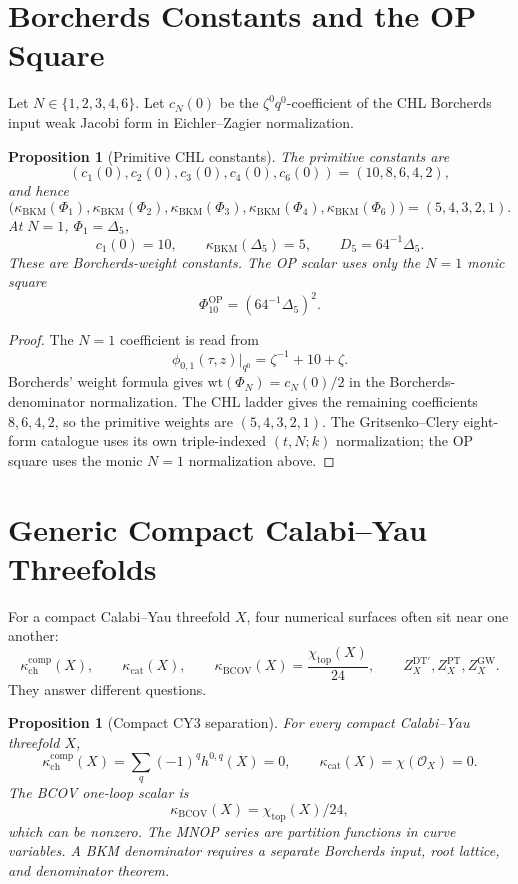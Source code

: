 \documentclass[11pt]{article}
\newtheorem{proposition}[theorem]{Proposition}
\providecommand{\cO}{\mathcal{O}}
\providecommand{\DT}{\mathrm{DT}}
\providecommand{\GW}{\mathrm{GW}}
\providecommand{\PT}{\mathrm{PT}}
\providecommand{\kchcomp}{\kappa_{\mathrm{ch}}^{\mathrm{comp}}}
\providecommand{\kcat}{\kappa_{\mathrm{cat}}}
\providecommand{\kBKM}{\kappa_{\mathrm{BKM}}}
\providecommand{\kBCOV}{\kappa_{\mathrm{BCOV}}}
\providecommand{\DeltaFive}{\Delta_5}
\providecommand{\PhiTen}{\Phi_{10}}
\providecommand{\Dfive}{D_5}
\begin{document}
\section{Borcherds Constants and the OP Square}

Let \(N\in\{1,2,3,4,6\}\).  Let \(c_N(0)\) be the
\(\zeta^0q^0\)-coefficient of the CHL Borcherds input weak Jacobi
form in Eichler--Zagier normalization.

\begin{proposition}[Primitive CHL constants]
The primitive constants are
\[
  (c_1(0),c_2(0),c_3(0),c_4(0),c_6(0))
  =
  (10,8,6,4,2),
\]
and hence
\[
  \bigl(\kBKM(\Phi_1),\kBKM(\Phi_2),\kBKM(\Phi_3),
        \kBKM(\Phi_4),\kBKM(\Phi_6)\bigr)
  =
  (5,4,3,2,1).
\]
At \(N=1\), \(\Phi_1=\DeltaFive\),
\[
  c_1(0)=10,\qquad \kBKM(\DeltaFive)=5,\qquad
  \Dfive=64^{-1}\DeltaFive .
\]
These are Borcherds-weight constants.  The OP scalar uses only the
\(N=1\) monic square
\[
  \PhiTen^{\mathrm{OP}}
  =
  (64^{-1}\DeltaFive)^2.
\]
\end{proposition}

\begin{proof}
The \(N=1\) coefficient is read from
\[
  \phi_{0,1}(\tau,z)|_{q^0}=\zeta^{-1}+10+\zeta .
\]
Borcherds' weight formula gives
\(\mathrm{wt}(\Phi_N)=c_N(0)/2\) in the Borcherds-denominator
normalization.  The CHL ladder gives the remaining coefficients
\(8,6,4,2\), so the primitive weights are \((5,4,3,2,1)\).  The
Gritsenko--Clery eight-form catalogue uses its own
triple-indexed \((t,N;k)\) normalization; the OP square uses the
monic \(N=1\) normalization above.
\end{proof}

\section{Generic Compact Calabi--Yau Threefolds}

For a compact Calabi--Yau threefold \(X\), four numerical surfaces
often sit near one another:
\[
  \kchcomp(X),\qquad
  \kcat(X),\qquad
  \kBCOV(X)=\frac{\chi_{\mathrm{top}}(X)}{24},\qquad
  Z_X^{\DT\prime},Z_X^{\PT},Z_X^{\GW}.
\]
They answer different questions.

\begin{proposition}[Compact CY3 separation]
For every compact Calabi--Yau threefold \(X\),
\[
  \kchcomp(X)=\sum_q(-1)^q h^{0,q}(X)=0,
  \qquad
  \kcat(X)=\chi(\cO_X)=0.
\]
The BCOV one-loop scalar is
\[
  \kBCOV(X)=\chi_{\mathrm{top}}(X)/24,
\]
which can be nonzero.  The MNOP series are partition functions in
curve variables.  A BKM denominator requires a separate Borcherds
input, root lattice, and denominator theorem.
\end{proposition}
\end{document}
